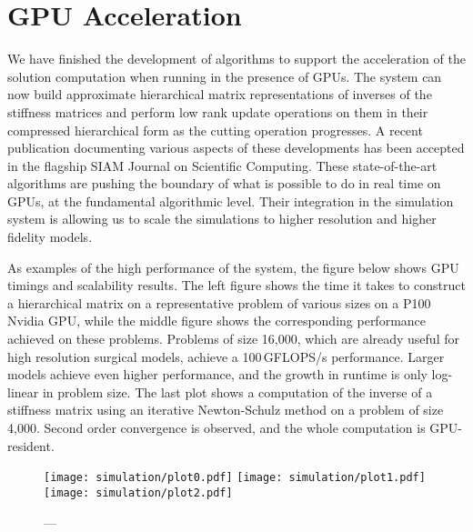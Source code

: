 \section{GPU Acceleration}
We have finished the development of algorithms to support the acceleration of the solution computation when running in the presence of GPUs.  The system can now build approximate hierarchical matrix representations of inverses of the stiffness matrices and perform low rank update operations on them in their compressed hierarchical form as the cutting operation progresses. A recent publication documenting various aspects of these developments has been accepted in the flagship SIAM Journal on Scientific Computing. These state-of-the-art algorithms are pushing the boundary of what is possible to do in real time on GPUs, at the fundamental algorithmic level. Their integration in the simulation system is allowing us to scale the simulations to higher resolution and higher fidelity models.

As examples of the high performance of the system, the figure below shows GPU timings and scalability results. The left figure shows the time it takes to construct a hierarchical matrix on a representative problem of various sizes on a P100 Nvidia GPU, while the middle figure shows the corresponding performance achieved on these problems. Problems of size 16,000, which are already useful for high resolution surgical models, achieve a 100\,GFLOPS/s performance. Larger models achieve even higher performance, and the growth in runtime is only log-linear in problem size. The last plot shows a computation of the inverse of a stiffness matrix using an iterative Newton-Schulz method on a problem of size 4,000. Second order convergence is observed, and the whole computation is GPU-resident.

\begin{figure}
  \centering%
  \texttt{[image: simulation/plot0.pdf]}
  \hfill%
  \texttt{[image: simulation/plot1.pdf]}
  \hfill%
  \texttt{[image: simulation/plot2.pdf]}
  \caption{---}\label{fig:plots}
\end{figure}

\clearpage%
